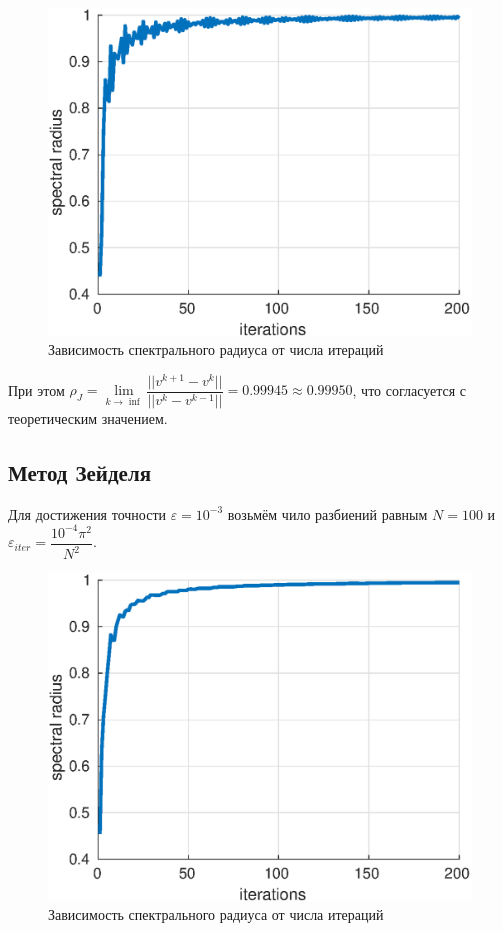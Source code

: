 \documentclass[12pt]{article}
\begin{document}
\begin{figure}[H]
\centerline{\includegraphics[scale = 0.8]{jacobiSpectre.eps}}
\caption{Зависимость спектрального радиуса от числа итераций}
\end{figure} 

При этом $\rho_{J} = \lim\limits_{k\rightarrow \inf}{\dfrac{||v^{k+1} - v^{k}||}{||v^{k} - v^{k-1}||}} = 0.99945 \approx 0.99950 $, что согласуется с теоретическим значением.
 
\subsection{Метод Зейделя}

Для достижения точности $\varepsilon = 10^{-3}$ возьмём чило разбиений равным $N = 100$ и $\varepsilon_{iter} = \dfrac{10^{-4}\pi^2}{N^2}$. 

\begin{figure}[H]
\centerline{\includegraphics[scale = 0.8]{zeidelSpectre.eps}}
\caption{Зависимость спектрального радиуса от числа итераций}
\end{figure} 
\end{document}

